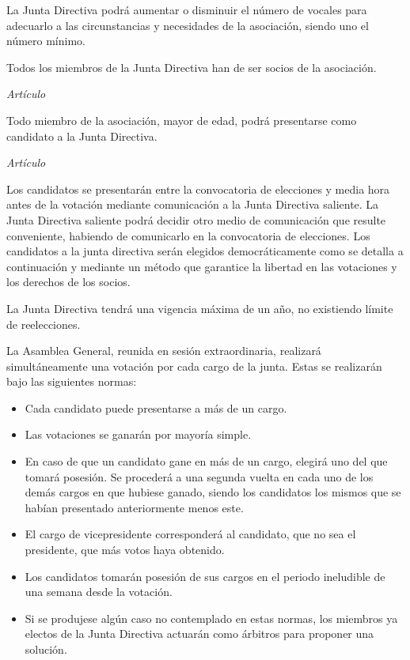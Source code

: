 \documentclass[11pt,oneside,onecolumn,a4paper]{article} \usepackage[utf8]{inputenc} \usepackage[spanish]{babel} \usepackage{enumerate} \pagestyle{plain}
\newcounter{articulos} \setcounter{articulos}{1} \newcounter{capitulos} \setcounter{capitulos}{1} \newcounter{titulos} \setcounter{titulos}{1}
\newcommand{\articulo}{\medskip \noindent \emph{Artículo \arabic{articulos} } \smallskip \addtocounter{articulos}{1}} \newcommand{\titulo}[1]{\medskip \noindent \emph{Título \roman{titulos}:} #1 \addcontentsline{toc}{section}{Título \roman{titulos}: #1} \smallskip \addtocounter{titulos}{1}} \newcommand{\capitulo}[1]{\medskip \noindent \emph{Capítulo \roman{capitulos}:} #1 \addcontentsline{toc}{subsection}{Capítulo \roman{capitulos}: #1} \smallskip \addtocounter{capitulos}{1}}
\begin{document}
      La Junta Directiva podrá aumentar o disminuir el número de vocales para adecuarlo a las circunstancias y necesidades de la asociación, siendo uno el número mínimo.

      Todos los miembros de la Junta Directiva han de ser socios de la asociación.

      \articulo 

      Todo miembro de la asociación, mayor de edad, podrá presentarse como candidato a la Junta Directiva.


      \articulo 

      Los candidatos se presentarán entre la convocatoria de elecciones y media hora antes de la votación mediante comunicación a la Junta Directiva saliente. La Junta Directiva saliente podrá decidir otro medio de comunicación que resulte conveniente, habiendo de comunicarlo en la convocatoria de elecciones. Los candidatos a la junta directiva serán elegidos democráticamente como se detalla a continuación y mediante un método que garantice la libertad en las votaciones y los derechos de los socios.

      La Junta Directiva tendrá una vigencia máxima de un año, no existiendo límite de reelecciones.

      La Asamblea General, reunida en sesión extraordinaria, realizará simultáneamente una votación por cada cargo de la junta. Estas se realizarán bajo las siguientes normas:

      \begin{itemize}

        \item Cada candidato puede presentarse a más de un cargo. \item Las votaciones se ganarán por mayoría simple. \item En caso de que un candidato gane en más de un cargo, elegirá uno del que tomará posesión. Se procederá a una segunda vuelta en cada uno de los demás cargos en que hubiese ganado, siendo los candidatos los mismos que se habían presentado anteriormente menos este. \item El cargo de vicepresidente corresponderá al candidato, que no sea el presidente, que más votos haya obtenido. \item Los candidatos tomarán posesión de sus cargos en el periodo ineludible de una semana desde la votación. \item Si se produjese algún caso no contemplado en estas normas, los miembros ya electos de la Junta Directiva actuarán como árbitros para proponer una solución.

	\end{itemize}
\end{document}

